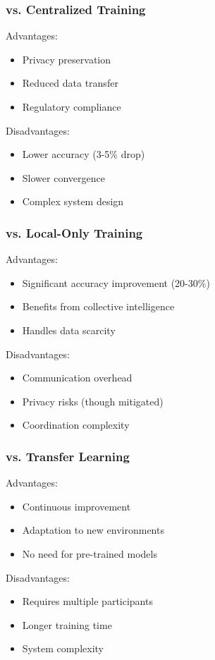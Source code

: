 \documentclass[journal]{IEEEtran}
\begin{document}
\subsubsection{vs. Centralized Training}
Advantages:
\begin{itemize}
\item Privacy preservation
\item Reduced data transfer
\item Regulatory compliance
\end{itemize}

Disadvantages:
\begin{itemize}
\item Lower accuracy (3-5\% drop)
\item Slower convergence
\item Complex system design
\end{itemize}

\subsubsection{vs. Local-Only Training}
Advantages:
\begin{itemize}
\item Significant accuracy improvement (20-30\%)
\item Benefits from collective intelligence
\item Handles data scarcity
\end{itemize}

Disadvantages:
\begin{itemize}
\item Communication overhead
\item Privacy risks (though mitigated)
\item Coordination complexity
\end{itemize}

\subsubsection{vs. Transfer Learning}
Advantages:
\begin{itemize}
\item Continuous improvement
\item Adaptation to new environments
\item No need for pre-trained models
\end{itemize}

Disadvantages:
\begin{itemize}
\item Requires multiple participants
\item Longer training time
\item System complexity
\end{itemize}
\end{document}
